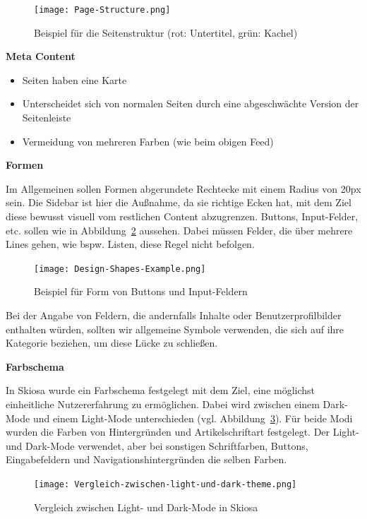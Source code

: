 \begin{figure}
    \texttt{[image: Page-Structure.png]}
    \caption{Beispiel für die Seitenstruktur (rot: Untertitel, grün: Kachel)}
    \label{fig:Page-Structure-Example}
\end{figure}

\textbf{Meta Content}
\begin{itemize}
    \item Seiten haben eine Karte
    \item Unterscheidet sich von normalen Seiten durch eine abgeschwächte Version der Seitenleiste
    \item Vermeidung von mehreren Farben (wie beim obigen Feed)
\end{itemize}
 
\textbf{Formen}

Im Allgemeinen sollen Formen abgerundete Rechtecke mit einem Radius von 20px sein. Die Sidebar ist hier die Außnahme, da sie richtige Ecken hat, 
mit dem Ziel diese bewusst visuell vom restlichen Content abzugrenzen.
Buttons, Input-Felder, etc. sollen wie in Abbildung~\ref{fig:Design-Shapes-Example} aussehen. 
Dabei müssen Felder, die über mehrere Lines gehen, wie bspw. Listen, diese Regel nicht befolgen.

\begin{figure}[H]
    \texttt{[image: Design-Shapes-Example.png]}
    \caption{Beispiel für Form von Buttons und Input-Feldern}
    \label{fig:Design-Shapes-Example}
\end{figure}

Bei der Angabe von Feldern, die andernfalls Inhalte oder Benutzerprofilbilder enthalten würden,
sollten wir allgemeine Symbole verwenden, die sich auf ihre Kategorie beziehen, um diese Lücke zu schließen.

\textbf{Farbschema}

In Skiosa wurde ein Farbschema festgelegt mit dem Ziel, 
eine möglichst einheitliche Nutzererfahrung zu ermöglichen. 
Dabei wird zwischen einem Dark-Mode und einem Light-Mode unterschieden (vgl. Abbildung~\ref{fig:Vergleich-light-dark}).
Für beide Modi wurden die Farben von Hintergründen und Artikelschriftart festgelegt.
Der Light- und Dark-Mode verwendet, 
aber bei sonstigen Schriftfarben, Buttons, Eingabefeldern und Navigationshintergründen die selben Farben.

\begin{figure}[h]
    \texttt{[image: Vergleich-zwischen-light-und-dark-theme.png]}
    \caption{Vergleich zwischen Light- und Dark-Mode in Skiosa}
    \label{fig:Vergleich-light-dark}
\end{figure}

